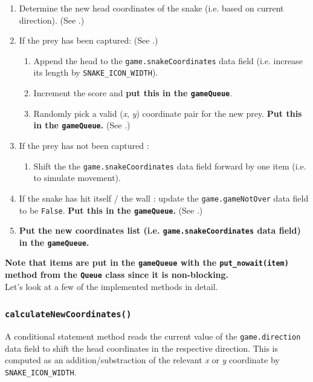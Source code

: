 \documentclass{article}
\begin{document}
\begin{enumerate}
    \item Determine the new head coordinates of the snake (i.e. based on current direction). (See .)
    \item If the prey has been captured: (See .)
    \begin{enumerate}
        \item Append the head to the \texttt{game.snakeCoordinates} data field (i.e. increase its length by \texttt{SNAKE\_ICON\_WIDTH}).
        \item Increment the score and \textbf{put this in the \texttt{gameQueue}}.
        \item Randomly pick a valid (\textit{x}, \textit{y}) coordinate pair for the new prey. \textbf{Put this in the \texttt{gameQueue}.} (See .)
    \end{enumerate}
    \item If the prey has not been captured :
    \begin{enumerate}
        \item Shift the the \texttt{game.snakeCoordinates} data field forward by one item (i.e. to simulate movement).
    \end{enumerate}
    \item If the snake has hit itself / the wall : update the \texttt{game.gameNotOver} data field to be \texttt{False}. \textbf{Put this in the \texttt{gameQueue}.} (See .)
    \item\textbf{Put the new coordinates list (i.e. \texttt{game.snakeCoordinates} data field) in the \texttt{gameQueue}.}
\end{enumerate}

\textbf{Note that items are put in the \texttt{gameQueue} with the \texttt{put\_nowait(item)} method from the \texttt{Queue} class since it is non-blocking.} \\

Let's look at a few of the implemented methods in detail.

\subsubsection{\texttt{calculateNewCoordinates()}}\label{sec:New_Snake_Coordinates}
A conditional statement  method reads the current value of the \texttt{game.direction} data field to
shift the head coordinates in the respective direction. This is computed as an addition/substraction of the relevant \textit{x} or \textit{y} coordinate by \texttt{SNAKE\_ICON\_WIDTH}.
\end{document}
